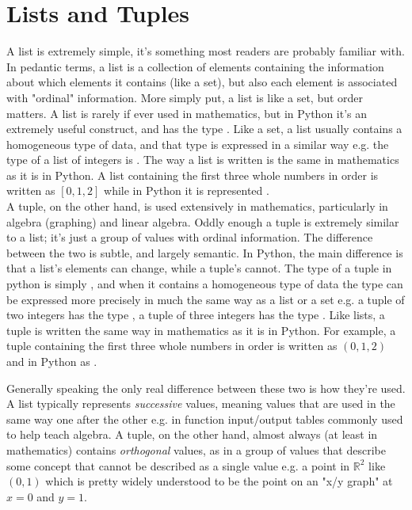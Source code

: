 \section{Lists and Tuples}
A list is extremely simple, it's something most readers are probably familiar with. In pedantic terms, a list is a collection of elements containing the information about which elements it contains (like a set), but also each element is associated with "ordinal" information. More simply put, a list is like a set, but order matters. A list is rarely if ever used in mathematics, but in Python it's an extremely useful construct, and has the type . Like a set, a list usually contains a homogeneous type of data, and that type is expressed in a similar way e.g. the type of a list of integers is . The way a list is written is the same in mathematics as it is in Python. A list containing the first three whole numbers in order is written as $[0, 1, 2]$ while in Python it is represented \code{[0, 1, 2]}.\\

A tuple, on the other hand, is used extensively in mathematics, particularly in algebra (graphing) and linear algebra. Oddly enough a tuple is extremely similar to a list; it's just a group of values with ordinal information. The difference between the two is subtle, and largely semantic. In Python, the main difference is that a list's elements can change, while a tuple's cannot. The type of a tuple in python is simply , and when it contains a homogeneous type of data the type can be expressed more precisely in much the same way as a list or a set e.g. a tuple of two integers has the type , a tuple of three integers has the type . Like lists, a tuple is written the same way in mathematics as it is in Python. For example, a tuple containing the first three whole numbers in order is written as $(0, 1, 2)$ and in Python as .

Generally speaking the only real difference between these two is how they're used. A list typically represents \emph{successive} values, meaning values that are used in the same way one after the other e.g. in function input/output tables commonly used to help teach algebra. A tuple, on the other hand, almost always (at least in mathematics) contains \emph{orthogonal} values, as in a group of values that describe some concept that cannot be described as a single value e.g. a point in $\mathbb{R}^2$ like $(0, 1)$ which is pretty widely understood to be the point on an "x/y graph" at $x=0$ and $y=1$.

